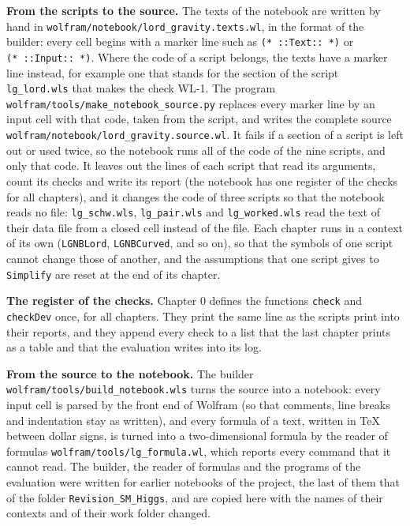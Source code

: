 \documentclass[
  10pt,
]{article}
\begin{document}
\textbf{From the scripts to the source.} The texts of the notebook are
written by hand in \texttt{wolfram/notebook/lord\_gravity.texts.wl}, in
the format of the builder: every cell begins with a marker line such as
\texttt{(*\ ::Text::\ *)} or \texttt{(*\ ::Input::\ *)}. Where the code
of a script belongs, the texts have a marker line instead, for example
one that stands for the section of the script \texttt{lg\_lord.wls} that
makes the check WL-1. The program
\texttt{wolfram/tools/make\_notebook\_source.py} replaces every marker
line by an input cell with that code, taken from the script, and writes
the complete source \texttt{wolfram/notebook/lord\_gravity.source.wl}.
It fails if a section of a script is left out or used twice, so the
notebook runs all of the code of the nine scripts, and only that code.
It leaves out the lines of each script that read its arguments, count
its checks and write its report (the notebook has one register of the
checks for all chapters), and it changes the code of three scripts so
that the notebook reads no file: \texttt{lg\_schw.wls},
\texttt{lg\_pair.wls} and \texttt{lg\_worked.wls} read the text of their
data file from a closed cell instead of the file. Each chapter runs in a
context of its own (\texttt{LGNB\textasciigrave{}Lord\textasciigrave{}},
\texttt{LGNB\textasciigrave{}Curved\textasciigrave{}}, and so on), so
that the symbols of one script cannot change those of another, and the
assumptions that one script gives to \texttt{Simplify} are reset at the
end of its chapter.

\textbf{The register of the checks.} Chapter 0 defines the functions
\texttt{check} and \texttt{checkDev} once, for all chapters. They print
the same line as the scripts print into their reports, and they append
every check to a list that the last chapter prints as a table and that
the evaluation writes into its log.

\textbf{From the source to the notebook.} The builder
\texttt{wolfram/tools/build\_notebook.wls} turns the source into a
notebook: every input cell is parsed by the front end of Wolfram (so
that comments, line breaks and indentation stay as written), and every
formula of a text, written in TeX between dollar signs, is turned into a
two-dimensional formula by the reader of formulas
\texttt{wolfram/tools/lg\_formula.wl}, which reports every command that
it cannot read. The builder, the reader of formulas and the programs of
the evaluation were written for earlier notebooks of the project, the
last of them that of the folder \texttt{Revision\_SM\_Higgs}, and are
copied here with the names of their contexts and of their work folder
changed.
\end{document}
